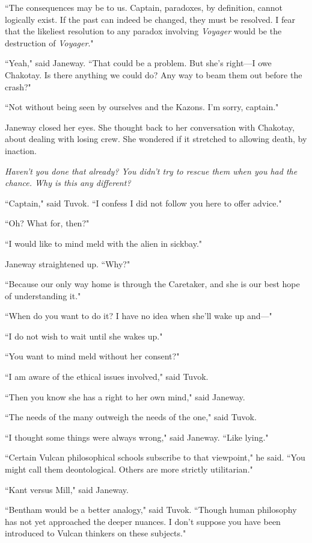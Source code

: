 \documentclass[twoside,letterpaper,12pt]{memoir}
\begin{document}
``The consequences may be to us. Captain, paradoxes, by definition, cannot logically exist. If the past can indeed be changed, they must be resolved. I fear that the likeliest resolution to any paradox involving \textit{Voyager} would be the destruction of \textit{Voyager}." 

``Yeah," said Janeway. ``That could be a problem. But she's right---I owe Chakotay. Is there anything we could do? Any way to beam them out before the crash?" 

``Not without being seen by ourselves and the Kazons. I'm sorry, captain." 

Janeway closed her eyes. She thought back to her conversation with Chakotay, about dealing with losing crew. She wondered if it stretched to allowing death, by inaction. 

\textit{Haven't you done that already? You didn't try to rescue them when you had the chance. Why is this any different?} 

``Captain," said Tuvok. ``I confess I did not follow you here to offer advice." 

``Oh? What for, then?" 

``I would like to mind meld with the alien in sickbay." 

Janeway straightened up. ``Why?" 

``Because our only way home is through the Caretaker, and she is our best hope of understanding it." 

``When do you want to do it? I have no idea when she'll wake up and---" 

``I do not wish to wait until she wakes up." 

``You want to mind meld without her consent?" 

``I am aware of the ethical issues involved," said Tuvok. 

``Then you know she has a right to her own mind," said Janeway. 

``The needs of the many outweigh the needs of the one," said Tuvok. 

``I thought some things were always wrong," said Janeway. ``Like lying." 

``Certain Vulcan philosophical schools subscribe to that viewpoint," he said. ``You might call them deontological. Others are more strictly utilitarian." 

``Kant versus Mill," said Janeway. 

``Bentham would be a better analogy," said Tuvok. ``Though human philosophy has not yet approached the deeper nuances. I don't suppose you have been introduced to Vulcan thinkers on these subjects." 
\end{document}

